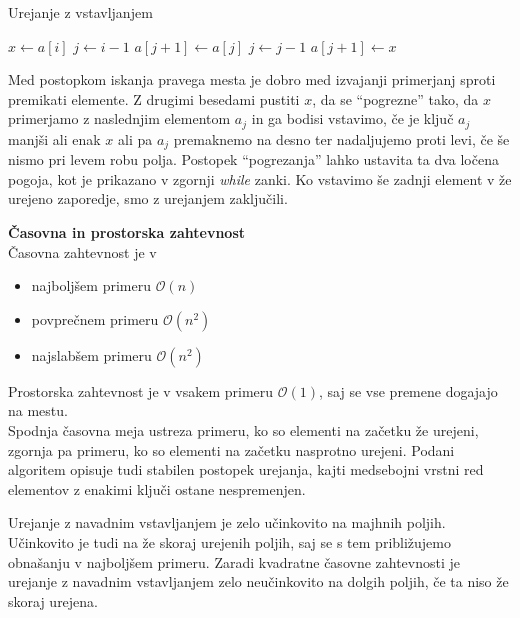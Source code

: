 \documentclass[a4paper,oneside,12pt]{article}
\newcommand{\subsubsubsection}[1]{\vspace*{1ex}\textbf{#1}\\}
\begin{document}
\begin{algorithm}
  \caption{Urejanje z vstavljanjem}\label{algo:insertionsort}
  \begin{algorithmic}[1]
            \State $x \gets a[i]$
            \State $j \gets i - 1$
                \State $a[j+1] \gets a[j]$
                \State $j \gets j - 1$
            \EndWhile
            \State $a[j+1] \gets x$
        \EndFor
    \EndFunction
  \end{algorithmic}
\end{algorithm}

Med postopkom iskanja pravega mesta je dobro med izvajanji primerjanj 
sproti premikati elemente. Z drugimi besedami pustiti $x$, da se ``pogrezne'' tako, da $x$
primerjamo z naslednjim elementom $a_j$ in ga bodisi vstavimo, če je ključ $a_j$ manjši
ali enak $x$ ali pa $a_j$ premaknemo na desno ter nadaljujemo proti levi, če še nismo pri
levem robu polja. Postopek ``pogrezanja'' lahko ustavita ta dva ločena
pogoja, kot je prikazano v zgornji \emph{while} zanki.  Ko vstavimo še zadnji element v že 
urejeno zaporedje, smo z urejanjem zaključili.

\subsubsubsection{Časovna in prostorska zahtevnost}
Časovna zahtevnost je v 
\begin{itemize}
  \item najboljšem primeru $\mathcal{O}(n)$
  \item povprečnem primeru $\mathcal{O}(n^2)$
  \item najslabšem primeru $\mathcal{O}(n^2)$
\end{itemize}

Prostorska zahtevnost je v vsakem primeru $\mathcal{O}(1)$, saj se vse premene dogajajo na
mestu.\\

Spodnja časovna meja ustreza primeru, ko so elementi na začetku že urejeni, zgornja pa primeru,
ko so elementi na začetku nasprotno urejeni. Podani algoritem opisuje tudi stabilen postopek urejanja, kajti medsebojni
vrstni red elementov z enakimi ključi ostane nespremenjen.

Urejanje z navadnim vstavljanjem je zelo učinkovito na majhnih poljih. Učinkovito je tudi na že
skoraj urejenih poljih, saj se s tem približujemo obnašanju v najboljšem primeru.
Zaradi kvadratne časovne zahtevnosti je urejanje z navadnim vstavljanjem zelo neučinkovito na
dolgih poljih, če ta niso že skoraj urejena.
\end{document}
